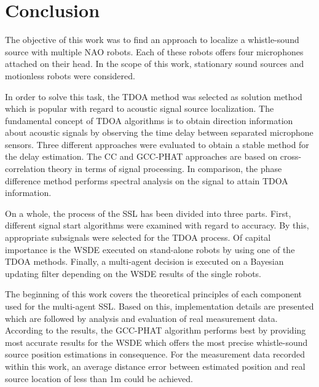 \chapter{Conclusion}
\label{chap:05_conclusion}

The objective of this work was to find an approach to localize a whistle-sound
source with multiple NAO robots. 
Each of these robots offers four microphones attached on their head.
In the scope of this work, stationary sound sources and motionless robots were
considered.

In order to solve this task, the \acf{TDOA} method was selected as solution method
which is popular with regard to acoustic signal source localization.
The fundamental concept of \ac{TDOA} algorithms is to obtain direction information
about acoustic signals by observing the time delay between separated microphone sensors.
Three different approaches were evaluated to obtain a stable method
for the delay estimation.
The \acf{CC} and \acf{GCC-PHAT} approaches are based on cross-correlation theory in terms
of signal processing.
In comparison, the phase difference method performs spectral analysis on the signal
to attain \ac{TDOA} information.

On a whole, the process of the \acf{SSL} has been divided into three parts.
First, different signal start algorithms were examined with regard to accuracy.
By this, appropriate subsignals were selected for the \ac{TDOA} process.
Of capital importance is the \acf{WSDE} executed on stand-alone robots by
using one of the \ac{TDOA} methods.
Finally, a multi-agent decision is executed on a Bayesian updating filter
depending on the \ac{WSDE} results of the single robots.

The beginning of this work covers the theoretical principles of each component
used for the multi-agent \ac{SSL}.
Based on this, implementation details are presented which are followed by analysis
and evaluation of real measurement data.
According to the results, the \acf{GCC-PHAT} algorithm performs best by
providing most accurate results for the \ac{WSDE} which offers the most precise
whistle-sound source position estimations in consequence.
For the measurement data recorded within this work, an average
distance error between estimated position and real source location
of less than 1\si{\meter} could be achieved.

